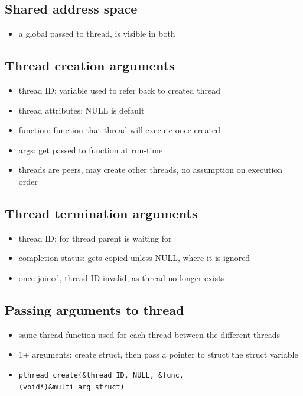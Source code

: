 \documentclass[10pt, multicolumn, a4paper]{article}
\begin{document}
\begin{multicols}{2}
	\subsection*{Shared address space}
	\begin{itemize}
	\item a global passed to thread, is visible in both
	\end{itemize}
	\subsection*{Thread creation arguments}
	\begin{itemize}
	\item thread ID: variable used to refer back to created thread
	\item thread attributes: NULL is default
	\item function: function that thread will execute once created
	\item args: get passed to function at run-time
	\item threads are peers, may create other threads, no assumption on execution order
	\end{itemize}
	\subsection*{Thread termination arguments}
	\begin{itemize}
	\item thread ID: for thread parent is waiting for
	\item completion status: gets copied unless NULL, where it is ignored
	\item once joined, thread ID invalid, as thread no longer exists
	\end{itemize}
	\subsection*{Passing arguments to thread}
	\begin{itemize}
	\item same thread function used for each thread between the different threads
	\item 1+ arguments: create struct, then pass a pointer to struct the struct variable
	\item \verb|pthread_create(&thread_ID, NULL, &func,| \\ \verb|(void*)&multi_arg_struct)|
	\end{itemize}

\end{multicols}
\end{document}
